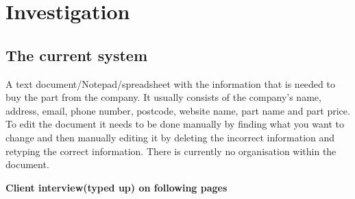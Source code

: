 \section{Investigation}

\subsection{The current system}
A text document/Notepad/spreadsheet with the information that is needed to buy the part from the company. It usually consists of the company's name, address, email, phone number, postcode, website name, part name and part price. To edit the document it needs to be done manually by finding what you want to change and then manually editing it by deleting the incorrect information and retyping the correct information. There is currently no organisation within the document.

\textbf{Client interview(typed up) on following pages}\\


